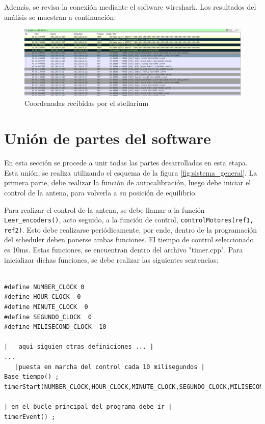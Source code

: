 Además, se revisa la conexión mediante el software wireshark. Los resultados del análisis se muestran a continuación: 



\begin{figure}[ht!]
	\includegraphics{wireshark_stellarium}
	\caption{Coordenadas recibidas por el stellarium}
	\label{fig:wireshark_stell}
\end{figure}

\section{Unión de partes del software} 

En esta sección se procede a unir todas las partes desarrolladas en esta etapa. Esta unión, se realiza utilizando el esquema de la figura \ref{fig:sistema_general}. La primera parte, debe realizar la función de autocalibración, luego debe iniciar el control de la antena, para volverla a su posición de equilibrio.  

Para realizar el control de la antena, se debe llamar a la función \texttt{Leer_encoders()}, acto seguido, a la función de control, \texttt{controlMotores(ref1, ref2)}. Esto debe realizarse periódicamente, por ende, dentro de la programación del scheduler deben ponerse ambas funciones. El tiempo de control seleccionado es 10ms. Estas funciones, se encuentran dentro del archivo "timer.cpp". Para inicializar dichas funciones, se debe realizar las siguientes sentencias: 

\begin{listing}[ht]
	\begin{verbatim}

#define NUMBER_CLOCK 0 
#define HOUR_CLOCK  0 
#define MINUTE_CLOCK  0 
#define SEGUNDO_CLOCK  0 
#define MILISECOND_CLOCK  10 

|   aqui siguien otras definiciones ... |
...
   |puesta en marcha del control cada 10 milisegundos |
Base_tiempo() ; 
timerStart(NUMBER_CLOCK,HOUR_CLOCK,MINUTE_CLOCK,SEGUNDO_CLOCK,MILISECOND_CLOCK)

| en el bucle principal del programa debe ir |
timerEvent() ; 

	\end{verbatim}
\end{listing} 

